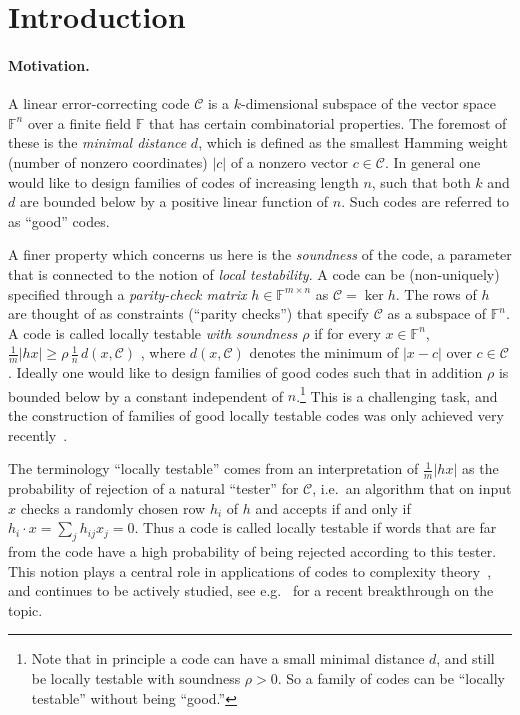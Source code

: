 \documentclass[11pt]{article}
\theoremstyle{definition}
\newcommand{\code}{\mathscr{C}}
\newcommand{\F}{\ensuremath{\mathbb{F}}}
\begin{document}
\section{Introduction}

\paragraph{Motivation.}
A linear error-correcting code $\code$ is a $k$-dimensional subspace of the vector space $\F^n$ over a finite field $\F$ that has certain combinatorial properties. The foremost of these is the \emph{minimal distance} $d$, which is defined as the smallest Hamming weight (number of nonzero coordinates) $|c|$ of a nonzero vector  $c\in\code$. In general one would like to design families of codes of increasing length $n$, such that both $k$ and $d$ are bounded below by a positive linear function of $n$. Such codes are referred to as ``good'' codes.

A finer property which concerns us here is the \emph{soundness} of the code, a parameter that is connected to the notion of \emph{local testability}. A code can be (non-uniquely) specified through a \emph{parity-check matrix} $h\in\F^{m\times n}$ as $\code = \ker h$. The rows of $h$ are thought of as constraints (``parity checks'') that specify $\code$ as a subspace of $\F^n$. A code is called locally testable \emph{with soundness $\rho$} if for every $x\in \F^n$, $\frac{1}{m}|hx|\geq \rho \, \frac{1}{n}\, d(x,\code)$ , where $d(x,\code)$ denotes the minimum of $|x-c|$ over $c\in \code$.  Ideally one would like to design families of good codes such that in addition $\rho$ is bounded below by a constant independent of $n$.\footnote{Note that in principle a code can have a small minimal distance $d$, and still be locally testable with soundness $\rho>0$. So a family of codes can be ``locally testable'' without being ``good.''  } This is a challenging task, and the construction of families of good locally testable codes was only achieved very recently~\cite{LTC_DELLM}. 

The terminology ``locally testable'' comes from an interpretation of $\frac{1}{m}|hx|$ as the probability of rejection of a natural ``tester'' for $\code$, i.e.\ an algorithm that on input $x$ checks a randomly chosen row $h_i$ of $h$ and accepts if and only if $h_i\cdot x = \sum_j h_{ij} x_j =0$.  Thus a code is called locally testable if words that are far from the code have a high probability of being rejected according to this tester. This notion plays a central role in applications of codes to complexity theory~\cite{babai1991non,PCP_thm}, and continues to be actively studied, see e.g.~\cite{LTC_DELLM,LTC_Panteleev_Kalachev} for a recent breakthrough on the topic. 
\end{document}

